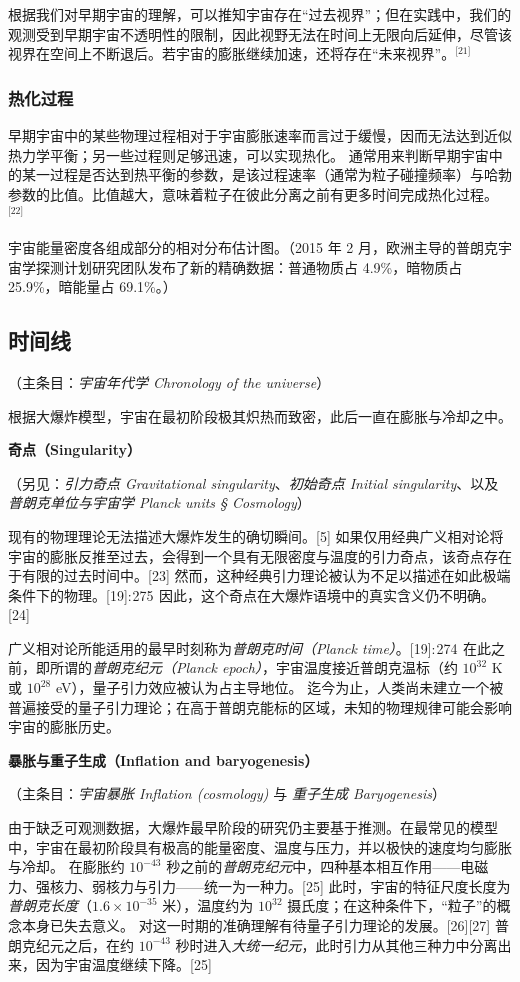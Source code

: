 根据我们对早期宇宙的理解，可以推知宇宙存在“过去视界”；但在实践中，我们的观测受到早期宇宙不透明性的限制，因此视野无法在时间上无限向后延伸，尽管该视界在空间上不断退后。若宇宙的膨胀继续加速，还将存在“未来视界”。\(^\text{[21]}\)
\subsubsection{热化过程}
早期宇宙中的某些物理过程相对于宇宙膨胀速率而言过于缓慢，因而无法达到近似热力学平衡；另一些过程则足够迅速，可以实现热化。  
通常用来判断早期宇宙中的某一过程是否达到热平衡的参数，是该过程速率（通常为粒子碰撞频率）与哈勃参数的比值。比值越大，意味着粒子在彼此分离之前有更多时间完成热化过程。\(^\text{[22]}\)

宇宙能量密度各组成部分的相对分布估计图。（2015 年 2 月，欧洲主导的普朗克宇宙学探测计划研究团队发布了新的精确数据：普通物质占 4.9\%，暗物质占 25.9\%，暗能量占 69.1\%。）

\subsection{时间线}

（主条目：\emph{宇宙年代学 Chronology of the universe}）

根据大爆炸模型，宇宙在最初阶段极其炽热而致密，此后一直在膨胀与冷却之中。

\textbf{奇点（Singularity）}

（另见：\emph{引力奇点 Gravitational singularity}、\emph{初始奇点 Initial singularity}、以及\emph{普朗克单位与宇宙学 Planck units § Cosmology}）

现有的物理理论无法描述大爆炸发生的确切瞬间。[5]  
如果仅用经典广义相对论将宇宙的膨胀反推至过去，会得到一个具有无限密度与温度的引力奇点，该奇点存在于有限的过去时间中。[23]  
然而，这种经典引力理论被认为不足以描述在如此极端条件下的物理。[19]: 275   
因此，这个奇点在大爆炸语境中的真实含义仍不明确。[24]

广义相对论所能适用的最早时刻称为\emph{普朗克时间（Planck time）}。[19]: 274   
在此之前，即所谓的\emph{普朗克纪元（Planck epoch）}，宇宙温度接近普朗克温标（约 $10^{32}$ K 或 $10^{28}$ eV），量子引力效应被认为占主导地位。  
迄今为止，人类尚未建立一个被普遍接受的量子引力理论；在高于普朗克能标的区域，未知的物理规律可能会影响宇宙的膨胀历史。

\textbf{暴胀与重子生成（Inflation and baryogenesis）}

（主条目：\emph{宇宙暴胀 Inflation (cosmology)} 与 \emph{重子生成 Baryogenesis}）

由于缺乏可观测数据，大爆炸最早阶段的研究仍主要基于推测。在最常见的模型中，宇宙在最初阶段具有极高的能量密度、温度与压力，并以极快的速度均匀膨胀与冷却。  
在膨胀约 $10^{-43}$ 秒之前的\emph{普朗克纪元}中，四种基本相互作用——电磁力、强核力、弱核力与引力——统一为一种力。[25]  
此时，宇宙的特征尺度长度为\emph{普朗克长度}（$1.6\times10^{-35}$ 米），温度约为 $10^{32}$ 摄氏度；在这种条件下，“粒子”的概念本身已失去意义。  
对这一时期的准确理解有待量子引力理论的发展。[26][27]  
普朗克纪元之后，在约 $10^{-43}$ 秒时进入\emph{大统一纪元}，此时引力从其他三种力中分离出来，因为宇宙温度继续下降。[25]

